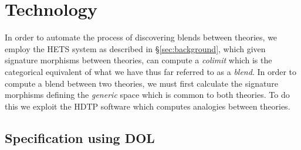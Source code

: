 \section{Technology} \label{sec:technology}

In order to automate the process of discovering blends between
theories, we employ the HETS system \cite{MossakowskiEA06} as described in
\S\ref{sec:background}, which given signature morphisms between
theories, can compute a {\em colimit} which is the categorical
equivalent of what we have thus far referred to as a {\em blend}. In order to compute a blend between two theories, we must first calculate the signature morphisms defining the {\em generic} space which is common to both theories. To do this we exploit the HDTP software \cite{GustKS2006,Schmidt2010} which computes analogies between theories.


\subsection{Specification using DOL}

